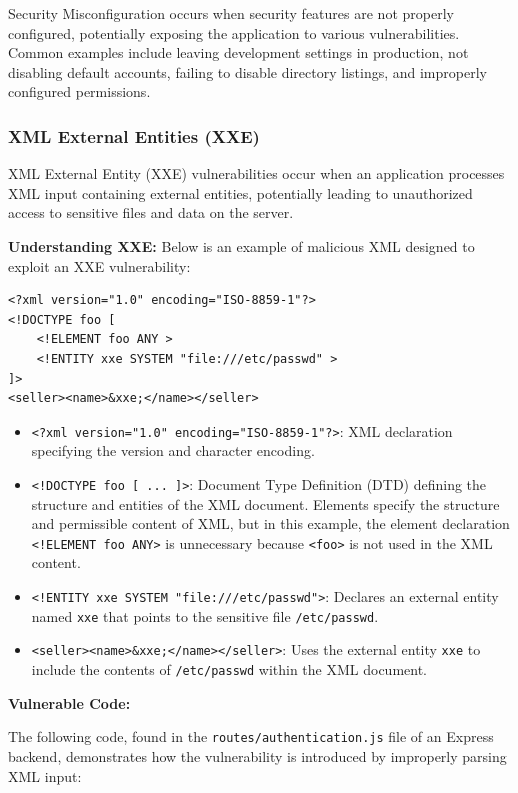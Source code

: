 \documentclass[]{article}
\begin{document}
Security Misconfiguration occurs when security features are not properly configured, potentially exposing the application to various vulnerabilities. Common examples include leaving development settings in production, not disabling default accounts, failing to disable directory listings, and improperly configured permissions.

\subsubsection{XML External Entities (XXE)}

XML External Entity (XXE) vulnerabilities occur when an application processes XML input containing external entities, potentially leading to unauthorized access to sensitive files and data on the server.

\textbf{Understanding XXE:}
Below is an example of malicious XML designed to exploit an XXE vulnerability:

\begin{lstlisting}
<?xml version="1.0" encoding="ISO-8859-1"?>
<!DOCTYPE foo [
    <!ELEMENT foo ANY >
    <!ENTITY xxe SYSTEM "file:///etc/passwd" >
]>
<seller><name>&xxe;</name></seller>
\end{lstlisting}

\begin{itemize}
    \item \texttt{<?xml version="1.0" encoding="ISO-8859-1"?>}: XML declaration specifying the version and character encoding.
    \item \texttt{<!DOCTYPE foo [ ... ]>}: Document Type Definition (DTD) defining the structure and entities of the XML document. Elements specify the structure and permissible content of XML, but in this example, the element declaration \texttt{<!ELEMENT foo ANY>} is unnecessary because \texttt{<foo>} is not used in the XML content.
    \item \texttt{<!ENTITY xxe SYSTEM "file:///etc/passwd">}: Declares an external entity named \texttt{xxe} that points to the sensitive file \texttt{/etc/passwd}.
    \item \texttt{<seller><name>\&xxe;</name></seller>}: Uses the external entity \texttt{xxe} to include the contents of \texttt{/etc/passwd} within the XML document.
\end{itemize}

\textbf{Vulnerable Code:}

The following code, found in the \texttt{routes/authentication.js} file of an Express backend, demonstrates how the vulnerability is introduced by improperly parsing XML input:
\end{document}
